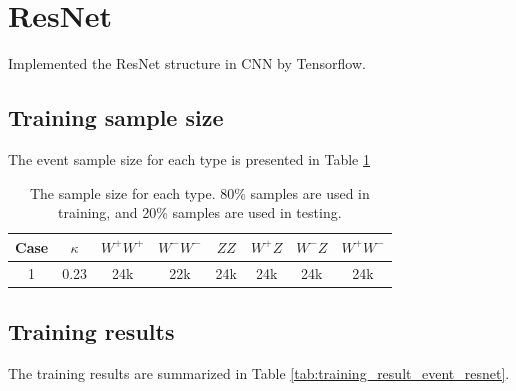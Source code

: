 \documentclass[12pt]{article}
\begin{document}
\section{ResNet}%
\label{sec:resnet}
	Implemented the ResNet structure in CNN by Tensorflow. 
	\subsection{Training sample size}%
	\label{sub:full_event_training_sample_size}
		The event sample size for each type is presented in Table \ref{tab:full_event_sample_size_resnet}
		\begin{table}[htpb]
			\centering
			\caption{The sample size for each type. 80\% samples are used in training, and 20\% samples are used in testing.}
			\label{tab:full_event_sample_size_resnet}
			\begin{tabular}{c|c|c|c|c|c|c|c}
			Case &$\kappa$& $W^+W^+$ & $W^-W^-$ & $ZZ$ & $W^+Z$ & $W^-Z$ & $W^+W^-$ \\ \hline
			1    & 0.23   & 24k      & 22k      & 24k  & 24k    & 24k    & 24k     
			\end{tabular}
		\end{table}
	\subsection{Training results}%
	\label{sub:full_event_training_results}
		The training results are summarized in Table \ref{tab:training_result_event_resnet}.
		\begin{table}[htpb]
			\centering
			\caption{The training results of the full event.}
			\label{tab:training_result_event_resnet}
		\end{table}
\end{document}
